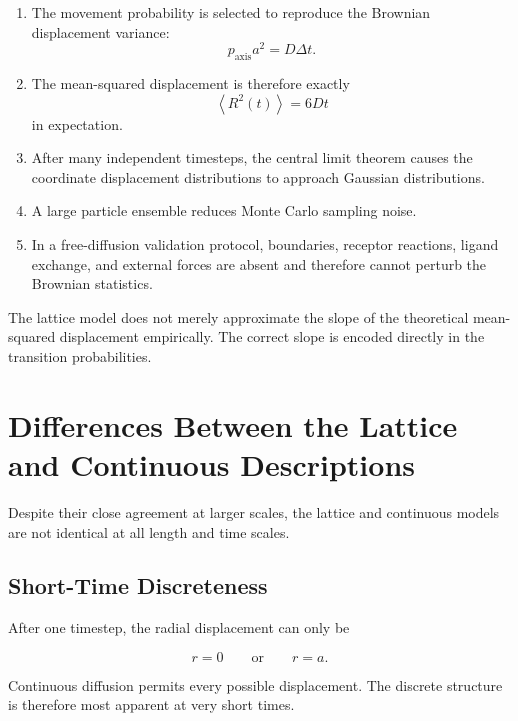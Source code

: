 \documentclass[11pt]{article}
\begin{document}
\begin{enumerate}
    \item The movement probability is selected to reproduce the Brownian displacement variance:
    \[
        p_{\mathrm{axis}}a^2
        =
        D\Delta t.
    \]

    \item The mean-squared displacement is therefore exactly
    \[
        \left\langle R^2(t)\right\rangle
        =
        6Dt
    \]
    in expectation.

    \item After many independent timesteps, the central limit theorem causes the coordinate displacement distributions to approach Gaussian distributions.

    \item A large particle ensemble reduces Monte Carlo sampling noise.

    \item In a free-diffusion validation protocol, boundaries, receptor reactions, ligand exchange, and external forces are absent and therefore cannot perturb the Brownian statistics.
\end{enumerate}

The lattice model does not merely approximate the slope of the theoretical mean-squared displacement empirically. The correct slope is encoded directly in the transition probabilities.

\section{Differences Between the Lattice and Continuous Descriptions}

Despite their close agreement at larger scales, the lattice and continuous models are not identical at all length and time scales.

\subsection{Short-Time Discreteness}

After one timestep, the radial displacement can only be

\begin{equation}
    r=0
    \qquad\text{or}\qquad
    r=a.
\end{equation}

Continuous diffusion permits every possible displacement. The discrete structure is therefore most apparent at very short times.
\end{document}
